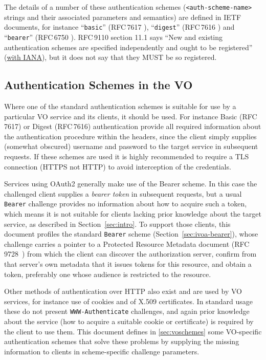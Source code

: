 \documentclass[11pt,a4paper]{ivoa}
\newcommand{\rfc}[1]{RFC\,#1}
\newcommand{\header}[1]{{\tt #1}}
\begin{document}
The details of a number of these authentication schemes
(\verb|<auth-scheme-name>| strings and their
associated parameters and semantics)
are defined in IETF documents, for instance
``{\tt basic}'' (\rfc{7617} \citet{std:RFC7617}),
``{\tt digest}'' (\rfc{7616} \citet{std:RFC7616})
and
``{\tt bearer}'' (\rfc{6750} \citet{std:RFC6750}).
\rfc{9110} section 11.1 says
``New and existing authentication schemes are
  specified independently and ought to be registered''
  (\href{https://www.iana.org/assignments/http-authschemes}{with IANA}),
but it does not say that they MUST be so registered.



\subsection{Authentication Schemes in the VO}

Where one of the standard authentication schemes is
suitable for use by a particular VO service and its clients,
it should be used.
For instance Basic (\rfc{7617}) or Digest (\rfc{7616}) authentication
provide all required
information about the authentication procedure within the headers,
since the client simply supplies
(somewhat obscured) username and password
to the target service in subsequent requests.
If these schemes are used it is highly recommended
to require a TLS connection (HTTPS not HTTP) to avoid interception of
the credentials.

Services using OAuth2 generally make use of the Bearer scheme.
In this case the challenged client supplies a {\em bearer token}
in subsequent requests,
but a usual \verb|Bearer| challenge provides no information about how to
acquire such a token, which means it is not suitable for clients lacking
prior knowledge about the target service, as described in
Section~\ref{sec:intro}. To support those clients, this document profiles the
standard \verb|Bearer| scheme (Section~\ref{sec:ivoa-bearer}), whose challenge
carries a pointer to a Protected Resource Metadata document (\rfc{9728}~\citep{std:RFC9728}) from
which the client can discover the authorization server, confirm from that
server's own metadata that it issues tokens for this resource, and obtain a
token, preferably one whose audience is restricted to the resource.

Other methods of authentication over HTTP also exist
and are used by VO services,
for instance use of cookies and of X.509 certificates.
In standard usage these do not present \header{WWW-Authenticate} challenges,
and again prior knowledge about the service
(how to acquire a suitable cookie or certificate)
is required by the client to use them.
This document defines in \ref{sec:voschemes}
some VO-specific authentication schemes
that solve these problems by supplying the missing information to
clients in scheme-specific challenge parameters.
\end{document}
